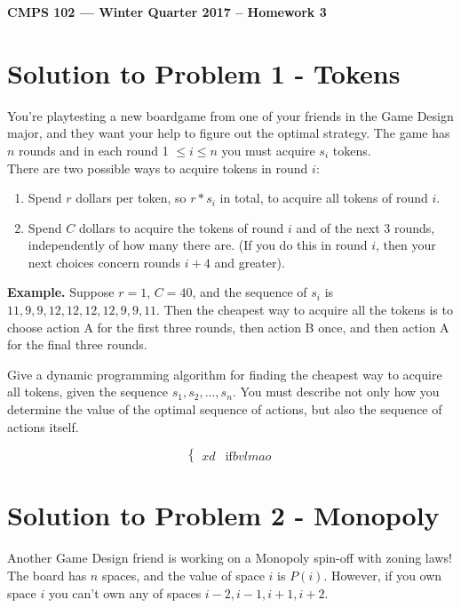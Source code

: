 \documentclass[11pt]{article}
\begin{document}
\begin{center}
{\bf\Large CMPS 102 --- Winter Quarter 2017 --  Homework 3}
\end{center}

\section*{Solution to Problem 1 - Tokens}

You're playtesting a new boardgame from one of your friends in the Game Design major, and they want your help to figure out the optimal strategy. The game has $n$ rounds and in each round 1 $\leq i \leq n$ you must acquire $s_i$ tokens.\\
There are two possible ways to acquire tokens in round $i$:

\begin{enumerate}[label=(\Alph*)]
\item Spend $r$ dollars per token, so $r * s_i$ in total, to acquire all tokens of round $i$.
\item Spend $C$ dollars to acquire the tokens of round $i$ and of the next 3 rounds, independently of how many there are. (If you do this in round $i$, then your next choices concern rounds $i + 4$ and greater).
\end{enumerate}

\textbf{Example.} Suppose $r = 1$, $C = 40$, and the sequence of $s_i$ is $11, 9, 9, 12, 12, 12, 12, 9, 9, 11$. Then the cheapest way to acquire all the tokens is to choose action A for the first three rounds, then action B once, and then action A for the final three rounds.


Give a dynamic programming algorithm for finding the cheapest way to acquire all tokens, given the sequence $s_1, s_2, ..., s_n$. You must describe not only how you determine the value of the optimal sequence of actions, but also the sequence of actions itself.

\begin{equation}
	\begin{cases}
	xd & \text{if} bvlmao
	\end{cases}
\end{equation}

\pagebreak

\section*{Solution to Problem 2 - Monopoly}

Another Game Design friend is working on a Monopoly spin-off with zoning laws! The board has $n$ spaces, and the value of space $i$ is $P(i)$. However, if you own space $i$ you can't own any of spaces $i - 2, i - 1, i + 1, i + 2$.
\end{document}
